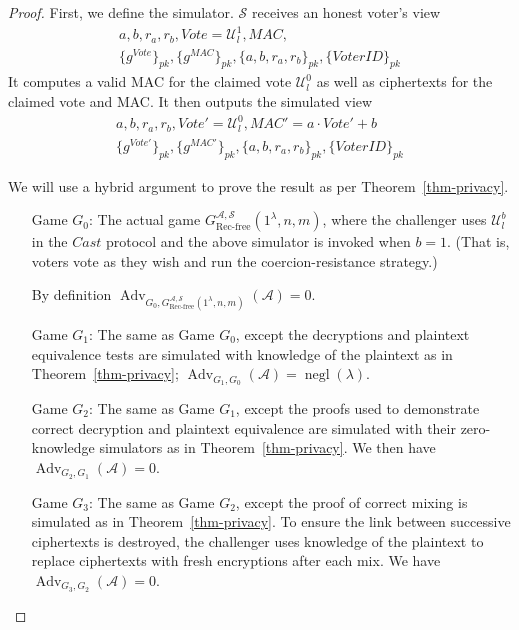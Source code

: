 \documentclass[12pt,a4paper]{article}
\DeclareMathOperator{\negl}{\text{negl}}
\DeclareMathOperator{\Adv}{\text{Adv}}
\theoremstyle{definition}
\newcommand{\Vote}{\mathit{Vote}}
\newcommand{\VoterID}{\mathit{VoterID}}
\newcommand{\Mac}{\mathit{MAC}}
\newcounter{protocol}
\begin{document}
\begin{proof}
    First, we define the simulator. $\mathcal{S}$ receives an honest voter's view
    \begin{gather*}
        a, b, r_a, r_b, \Vote=\mathcal{U}^1_l, \Mac,\\\{g^\Vote\}_{pk}, \{g^\Mac\}_{pk}, \{a,b,r_a,r_b\}_{pk},\{\VoterID\}_{pk}
    \end{gather*}
    It computes a valid MAC for the claimed vote $\mathcal{U}^0_l$ as well as ciphertexts for the claimed vote and MAC. It then outputs the simulated view
    \begin{gather*}
        a, b, r_a, r_b, \Vote'=\mathcal{U}^0_l, \Mac'=a\cdot\Vote'+b\,\\\{g^{\Vote'}\}_{pk}, \{g^{\Mac'}\}_{pk}, \{a,b,r_a,r_b\}_{pk},\{\VoterID\}_{pk}
    \end{gather*}

    We will use a hybrid argument to prove the result as per Theorem~\ref{thm-privacy}.
    \begin{itemize}[leftmargin=4em]
        \item[Game] $G_0$: The actual game $G^{\mathcal{A},\mathcal{S}}_\text{Rec-free}(1^\lambda,n,m)$, where the challenger uses $\mathcal{U}^b_l$ in the $\mathit{Cast}$ protocol and the above simulator is invoked when $b=1$.  (That is, voters vote as they wish and run the coercion-resistance strategy.)
        
        By definition $\Adv_{G_0,G^{\mathcal{A},\mathcal{S}}_{\text{Rec-free}}(1^\lambda,n,m)}(\mathcal{A}) = 0$.
    
        \item[Game] $G_1$: The same as Game $G_0$, except the decryptions and plaintext equivalence tests are simulated with knowledge of the plaintext as in Theorem~\ref{thm-privacy}; $\Adv_{G_1, G_0}(\mathcal{A})=\negl(\lambda)$.
    
        \item[Game] $G_2$: The same as Game $G_1$, except the proofs used to demonstrate correct decryption and plaintext equivalence are simulated with their zero-knowledge simulators as in Theorem~\ref{thm-privacy}. We then have $\Adv_{G_2, G_1}(\mathcal{A})=0$.
 
        \item[Game] $G_3$: The same as Game $G_2$, except the proof of correct mixing is simulated as in Theorem~\ref{thm-privacy}. To ensure the link between successive ciphertexts is destroyed, the challenger uses knowledge of the plaintext to replace ciphertexts with fresh encryptions after each mix. We have $\Adv_{G_3, G_2}(\mathcal{A})=0$.
    

\end{itemize}
\end{proof}
\end{document}
